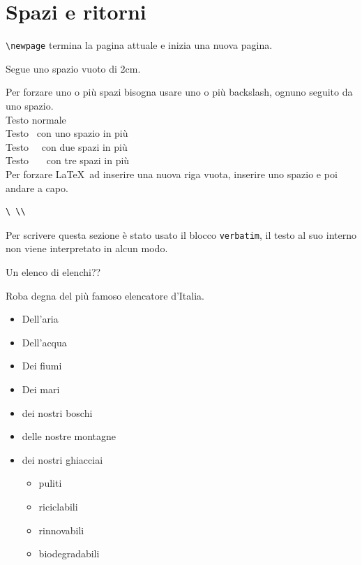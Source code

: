 \documentclass[envcountsame,envcountchap]{styles/svmono}
\begin{document}
\newpage
\section{Spazi e ritorni}
{\tt \textbackslash newpage} termina la pagina attuale e inizia una nuova pagina.

Segue uno spazio vuoto di 2cm.

\vspace*{2cm}

Per forzare uno o più spazi bisogna usare uno o più backslash, ognuno seguito da uno spazio.\\
Testo normale\\
Testo \ con uno spazio in più\\
Testo \ \ con due spazi in più\\
Testo \ \ \ con tre spazi in più\\

Per forzare \LaTeX\ ad inserire una nuova riga vuota, inserire uno spazio e poi andare a capo.\\
\begin{verbatim}
\ \\
\end{verbatim}
Per scrivere questa sezione è stato usato il blocco {\tt verbatim}, il testo al suo interno non viene
interpretato in alcun modo.



Un elenco di elenchi??

Roba degna del più famoso elencatore d'Italia.
\begin{itemize}
    \item Dell'aria
    \item Dell'acqua
    \item Dei fiumi
    \item Dei mari
    \item dei nostri boschi
    \item delle nostre montagne
    \item dei nostri ghiacciai
    \begin{itemize}
        \item puliti
        \item riciclabili
        \item rinnovabili
        \item biodegradabili
    \end{itemize} 
\end{itemize}
\end{document}
